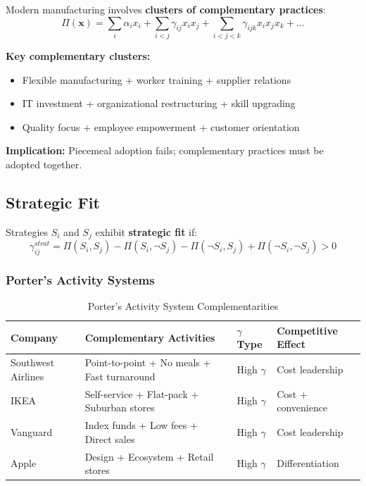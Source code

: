 \begin{tcolorbox}[colback=blue!5!white,colframe=blue!75!black,title=\textbf{Milgrom \& Roberts (1990, 1995): Organizational Complementarities}]
Modern manufacturing involves \textbf{clusters of complementary practices}:
\begin{equation}
\Pi(\mathbf{x}) = \sum_i \alpha_i x_i + \sum_{i < j} \gamma_{ij} x_i x_j + \sum_{i < j < k} \gamma_{ijk} x_i x_j x_k + \ldots
\end{equation}

\textbf{Key complementary clusters:}
\begin{itemize}[noitemsep]
    \item Flexible manufacturing + worker training + supplier relations
    \item IT investment + organizational restructuring + skill upgrading
    \item Quality focus + employee empowerment + customer orientation
\end{itemize}

\textbf{Implication:} Piecemeal adoption fails; complementary practices must be adopted together.
\end{tcolorbox}

\subsection{Strategic Fit}

\begin{definition}
Strategies $S_i$ and $S_j$ exhibit \textbf{strategic fit} if:
\begin{equation}
\gamma^{strat}_{ij} = \Pi(S_i, S_j) - \Pi(S_i, \neg S_j) - \Pi(\neg S_i, S_j) + \Pi(\neg S_i, \neg S_j) > 0
\end{equation}
\end{definition}

\subsubsection{Porter's Activity Systems}

\begin{table}[h]
\centering
\caption{Porter's Activity System Complementarities}
\label{tab:porter-gamma}
\renewcommand{\arraystretch}{1.2}
\small
\begin{tabular}{@{}p{2.5cm}p{4cm}p{2cm}p{3cm}@{}}
\toprule
\textbf{Company} & \textbf{Complementary Activities} & \textbf{$\gamma$ Type} & \textbf{Competitive Effect} \\
\midrule
Southwest Airlines & Point-to-point + No meals + Fast turnaround & High $\gamma$ & Cost leadership \\
IKEA & Self-service + Flat-pack + Suburban stores & High $\gamma$ & Cost + convenience \\
Vanguard & Index funds + Low fees + Direct sales & High $\gamma$ & Cost leadership \\
Apple & Design + Ecosystem + Retail stores & High $\gamma$ & Differentiation \\
\bottomrule
\end{tabular}
\end{table}

